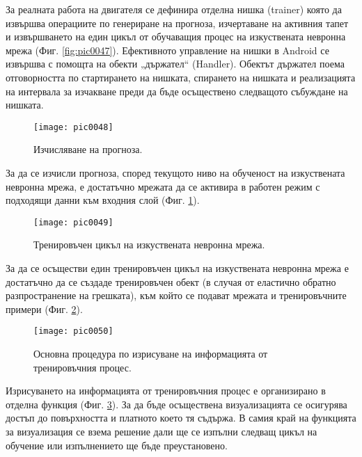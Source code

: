 За реалната работа на двигателя се дефинира отделна нишка (trainer) която да извършва операциите по генериране на прогноза, изчертаване на активния тапет и извършването на един цикъл от обучаващия процес на изкуствената невронна мрежа (Фиг. \ref{fig:pic0047}). Ефективното управление на нишки в Android се извършва с помощта на обекти „държател“ (Handler). Обектът държател поема отговорността по стартирането на нишката, спирането на нишката и реализацията на интервала за изчакване преди да бъде осъществено следващото събуждане на нишката. 

\begin{figure}[h]
  \centering
  \texttt{[image: pic0048]}
  \caption{Изчисляване на прогноза.}
\label{fig:pic0048}
\end{figure}
\FloatBarrier

За да се изчисли прогноза, според текущото ниво на обученост на изкуствената невронна мрежа, е достатъчно мрежата да се активира в работен режим с подходящи данни към входния слой (Фиг. \ref{fig:pic0048}).

\begin{figure}[h]
  \centering
  \texttt{[image: pic0049]}
  \caption{Тренировъчен цикъл на изкуствената невронна мрежа.}
\label{fig:pic0049}
\end{figure}
\FloatBarrier

За да се осъществи един тренировъчен цикъл на изкуствената невронна мрежа е достатъчно да се създаде тренировъчен обект (в случая от еластично обратно разпространение на грешката), към който се подават мрежата и тренировъчните примери (Фиг. \ref{fig:pic0049}).

\begin{figure}[h]
  \centering
  \texttt{[image: pic0050]}
  \caption{Основна процедура по изрисуване на информацията от тренировъчния процес.}
\label{fig:pic0050}
\end{figure}
\FloatBarrier

Изрисуването на информацията от тренировъчния процес е организирано в отделна функция (Фиг. \ref{fig:pic0050}). За да бъде осъществена визуализацията се осигурява достъп до повърхността и платното което тя съдържа. В самия край на функцията за визуализация се взема решение дали ще се изпълни следващ цикъл на обучение или изпълнението ще бъде преустановено. 

